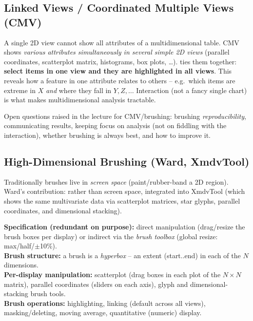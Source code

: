 \subsection{Linked Views / Coordinated Multiple Views (CMV)}
\begin{keybox}
A single 2D view cannot show all attributes of a multidimensional table. CMV shows \emph{various attributes simultaneously in several simple 2D views} (parallel coordinates, scatterplot matrix, histograms, box plots, \dots).  ties them together: \textbf{select items in one view and they are highlighted in all views}. This reveals how a feature in one attribute relates to others -- e.g.\ which items are extreme in $X$ \emph{and} where they fall in $Y,Z,\dots$ Interaction (not a fancy single chart) is what makes multidimensional analysis tractable.
\end{keybox}

Open questions raised in the lecture for CMV/brushing: brushing \emph{reproducibility}, communicating results, keeping focus on analysis (not on fiddling with the interaction), whether brushing is always best, and how to improve it.

\subsection{High-Dimensional Brushing (Ward, XmdvTool)}

Traditionally brushes live in \emph{screen space} (paint/rubber-band a 2D region). Ward's contribution:  rather than screen space, integrated into XmdvTool (which shows the same multivariate data via scatterplot matrices, star glyphs, parallel coordinates, and dimensional stacking).

\begin{keybox}
\textbf{Specification (redundant on purpose):} direct manipulation (drag/resize the brush boxes per display) or indirect via the \emph{brush toolbox} (global resize: max/half/$\pm$10\%). \\
\textbf{Brush structure:} a brush is a \emph{hyperbox} -- an extent (start..end) in each of the $N$ dimensions. \\
\textbf{Per-display manipulation:} scatterplot (drag boxes in each plot of the $N\times N$ matrix), parallel coordinates (sliders on each axis), glyph and dimensional-stacking brush tools. \\
\textbf{Brush operations:} highlighting, linking (default across all views), masking/deleting, moving average, quantitative (numeric) display.
\end{keybox}

